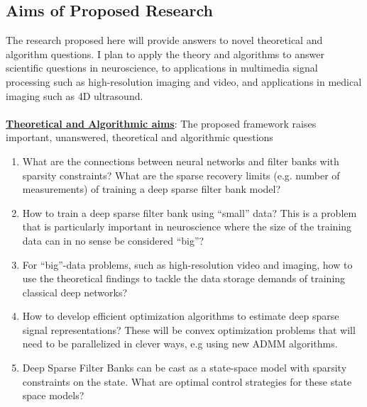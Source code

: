 \documentclass[12pt]{article}
\begin{document}
\subsection*{Aims of Proposed Research}

The research proposed here will provide answers to novel theoretical and algorithm questions. I plan to apply the theory and algorithms to answer scientific questions in neuroscience, to applications in multimedia signal processing such as high-resolution imaging and video, and applications in medical imaging such as 4D ultrasound.
\\
\\
\noindent \textbf{\underline{Theoretical and Algorithmic aims}}: The proposed framework raises important, unanswered, theoretical and algorithmic questions 

\begin{enumerate}
	\item What are the connections between neural networks and filter banks with sparsity constraints?  What are the sparse recovery limits (e.g. number of measurements) of training a deep sparse filter bank model?
	
	\item How to train a deep sparse filter bank using ``small'' data? This is a problem that is particularly important in neuroscience where the size of the training data can in no sense be considered ``big''?
	
	\item For ``big''-data problems, such as high-resolution video and imaging, how to use the theoretical findings to tackle the data storage demands of training classical deep networks?

	\item How to develop efficient optimization algorithms to estimate deep sparse signal representations? These will be convex optimization problems that will need to be parallelized in clever ways, e.g using new ADMM algorithms.	
	
	\item Deep Sparse Filter Banks can be cast as a state-space model with sparsity constraints on the state. What are optimal control strategies for these state space models?		
	
\end{enumerate}
\end{document}
